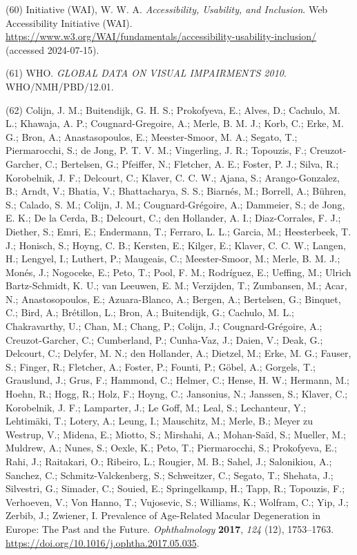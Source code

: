 \documentclass[11.5pt]{sig-alternate} %
\begin{document}
(60)	Initiative (WAI), W. W. A. \textit{Accessibility, Usability, and Inclusion}. Web Accessibility Initiative (WAI). 
\url{https://www.w3.org/WAI/fundamentals/accessibility-usability-inclusion/} (accessed 2024-07-15).

(61)	WHO. \textit{GLOBAL DATA ON VISUAL IMPAIRMENTS 2010}. WHO/NMH/PBD/12.01.

(62)	Colijn, J. M.; Buitendijk, G. H. S.; Prokofyeva, E.; Alves, D.; Cachulo, M. L.; Khawaja, A. P.; Cougnard-Gregoire, A.; Merle, B. M. J.; Korb, C.; Erke, M. G.; Bron, A.; Anastasopoulos, E.; Meester-Smoor, M. A.; Segato, T.; Piermarocchi, S.; de Jong, P. T. V. M.; Vingerling, J. R.; Topouzis, F.; Creuzot-Garcher, C.; Bertelsen, G.; Pfeiffer, N.; Fletcher, A. E.; Foster, P. J.; Silva, R.; Korobelnik, J. F.; Delcourt, C.; Klaver, C. C. W.; Ajana, S.; Arango-Gonzalez, B.; Arndt, V.; Bhatia, V.; Bhattacharya, S. S.; Biarnés, M.; Borrell, A.; Bühren, S.; Calado, S. M.; Colijn, J. M.; Cougnard-Grégoire, A.; Dammeier, S.; de Jong, E. K.; De la Cerda, B.; Delcourt, C.; den Hollander, A. I.; Diaz-Corrales, F. J.; Diether, S.; Emri, E.; Endermann, T.; Ferraro, L. L.; Garcia, M.; Heesterbeek, T. J.; Honisch, S.; Hoyng, C. B.; Kersten, E.; Kilger, E.; Klaver, C. C. W.; Langen, H.; Lengyel, I.; Luthert, P.; Maugeais, C.; Meester-Smoor, M.; Merle, B. M. J.; Monés, J.; Nogoceke, E.; Peto, T.; Pool, F. M.; Rodríguez, E.; Ueffing, M.; Ulrich Bartz-Schmidt, K. U.; van Leeuwen, E. M.; Verzijden, T.; Zumbansen, M.; Acar, N.; Anastosopoulos, E.; Azuara-Blanco, A.; Bergen, A.; Bertelsen, G.; Binquet, C.; Bird, A.; Brétillon, L.; Bron, A.; Buitendijk, G.; Cachulo, M. L.; Chakravarthy, U.; Chan, M.; Chang, P.; Colijn, J.; Cougnard-Grégoire, A.; Creuzot-Garcher, C.; Cumberland, P.; Cunha-Vaz, J.; Daien, V.; Deak, G.; Delcourt, C.; Delyfer, M. N.; den Hollander, A.; Dietzel, M.; Erke, M. G.; Fauser, S.; Finger, R.; Fletcher, A.; Foster, P.; Founti, P.; Göbel, A.; Gorgels, T.; Grauslund, J.; Grus, F.; Hammond, C.; Helmer, C.; Hense, H. W.; Hermann, M.; Hoehn, R.; Hogg, R.; Holz, F.; Hoyng, C.; Jansonius, N.; Janssen, S.; Klaver, C.; Korobelnik, J. F.; Lamparter, J.; Le Goff, M.; Leal, S.; Lechanteur, Y.; Lehtimäki, T.; Lotery, A.; Leung, I.; Mauschitz, M.; Merle, B.; Meyer zu Westrup, V.; Midena, E.; Miotto, S.; Mirshahi, A.; Mohan-Saïd, S.; Mueller, M.; Muldrew, A.; Nunes, S.; Oexle, K.; Peto, T.; Piermarocchi, S.; Prokofyeva, E.; Rahi, J.; Raitakari, O.; Ribeiro, L.; Rougier, M. B.; Sahel, J.; Salonikiou, A.; Sanchez, C.; Schmitz-Valckenberg, S.; Schweitzer, C.; Segato, T.; Shehata, J.; Silvestri, G.; Simader, C.; Souied, E.; Springelkamp, H.; Tapp, R.; Topouzis, F.; Verhoeven, V.; Von Hanno, T.; Vujosevic, S.; Williams, K.; Wolfram, C.; Yip, J.; Zerbib, J.; Zwiener, I. Prevalence of Age-Related Macular Degeneration in Europe: The Past and the Future. \textit{Ophthalmology} \textbf{2017}, \textit{124} (12), 1753–1763. \url{https://doi.org/10.1016/j.ophtha.2017.05.035}.
\end{document}
